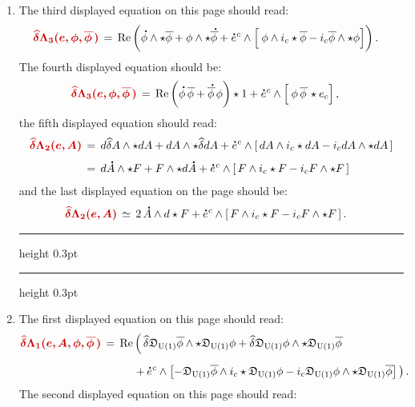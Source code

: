\documentclass[12pt]{GeomPhysBOOK}
\newcommand\mcorrect[1]{{\color{red!80!black}\bm{#1}}}
\newcommand\listrule{\vspace{0.2cm}\hrule height 0.3pt}
\begin{document}
\begin{enumerate}[leftmargin=1.9cm,labelwidth=1.4cm,itemsep=0.5cm]
	\item[\underline{page 393}:]
		The third displayed equation on this page should read:
		\begin{align*}
			\mcorrect{\delvar \Lambda_{3}(e,\phi,\phibar\,)} &\,=\, \text{Re}\left(\phidot \w \star \phibar + \phi \w \star\phibardot + \varye{c} \w \left[\df \phi \w i_{c}\star\phibar - i_{c}\phibar \w \star \phi  \right]\right). 
		\end{align*}
		The fourth displayed equation should be:
		\begin{align*}
			\mcorrect{\delvar \Lambda_{3}(e,\phi,\phibar\,)} &\,=\, \text{Re}\left( \phidot\,\phibar + \phibardot\,\phi \right)\star 1 + \varye{c} \w \left[\df \phi\,\phibar\, \star e_{c} \right], 
		\end{align*}
		the fifth displayed equation should read:
		\begin{align*}
			\mcorrect{\delvar \Lambda_{2}(e,A)} &\,=\, d\delvar A \w \star dA + dA \w \star \delvar dA + \varye{c} \w \left[\,dA \w i_{c}\star dA - i_{c}dA \w \star dA \,\right] \\[0.1cm]
				&\,=\, d\Adot \w \star F + F \w \star d\Adot + \varye{c} \w \left[\,F \w i_{c}\star F - i_{c}F \w \star F \,\right] 
		\end{align*} 
		and the last displayed equation on the page should be:
		\begin{align*}
			\mcorrect{\delvar \Lambda_{2}(e,A)} &\,\simeq\, 2\,\Adot \w d\star F + \varye{c} \w \left[\,F \w i_{c}\star F - i_{c}F \w \star F \,\right]. 
		\end{align*}
	\vspace{-0.3cm}
	\listrule
	\newpage
	\listrule
	\item[\underline{page 394}:]
		The first displayed equation on this page should read:
		\begin{align*}
			\mcorrect{\delvar \Lambda_{1}(e,A,\phi,\phibar\,)} &\,=\, \text{Re}\left(\, \delvar \GLD_{\text{U}(1)}\phibar \w \star \GLD_{\text{U}(1)}\phi + \delvar\GLD_{\text{U}(1)}\phi \w \star \GLD_{\text{U}(1)}\phibar\right. \\[0.2cm] 
				&\left. \hspace{1cm}+\, \varye{c} \w \left[ -\GLD_{\text{U}(1)}\phibar \w i_{c}\star \GLD_{\text{U}(1)}\phi - i_{c}\GLD_{\text{U}(1)}\phi \w \star \GLD_{\text{U}(1)}\phibar  \right]\, \right).
		\end{align*}
		The second displayed equation on this page should read:
		\begin{align*}

\end{align*}
\end{enumerate}
\end{document}
